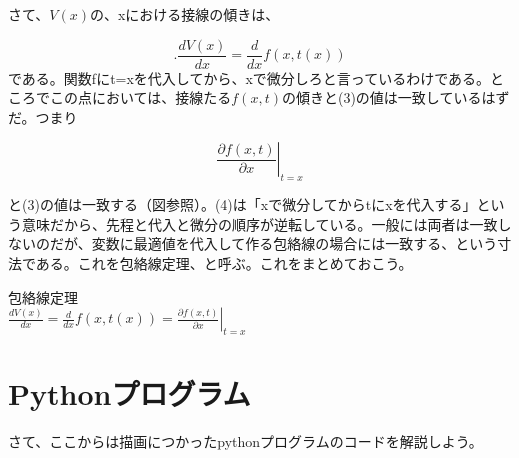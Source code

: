 \documentclass[11pt,a4j,fleqn]{jarticle}
\begin{document}
さて、$V(x)$の、xにおける接線の傾きは、

\begin{equation}
.\frac{dV(x)}{dx} = \frac{d}{dx}f(x,t(x))  
\end{equation}
である。関数fにt=xを代入してから、xで微分しろと言っているわけである。ところでこの点においては、接線たる$f(x,t)$の傾きと(3)の値は一致しているはずだ。つまり

\begin{equation}
\left.\frac{\partial f(x,t)}{\partial x}\right|_{t = x} 
\end{equation}

と(3)の値は一致する（図参照）。(4)は「xで微分してからtにxを代入する」という意味だから、先程と代入と微分の順序が逆転している。一般には両者は一致しないのだが、変数に最適値を代入して作る包絡線の場合には一致する、という寸法である。これを包絡線定理、と呼ぶ。これをまとめておこう。\\

\begin{shadebox}
包絡線定理\\
$ \frac{dV(x)}{dx} = \frac{d}{dx}f(x,t(x)) =\left.\frac{\partial f(x,t)}{\partial x}\right|_{t = x} $

\end{shadebox}

\section{Pythonプログラム}

さて、ここからは描画につかったpythonプログラムのコードを解説しよう。
\end{document}
